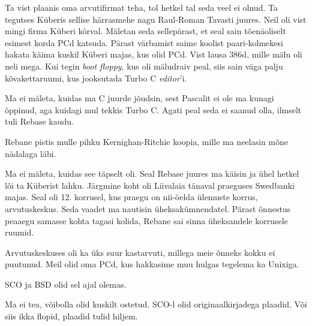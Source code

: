 
Ta vist plaanis oma arvutifirmat teha, tol 
hetkel tal seda veel ei olnud. Ta tegutses Küberis sellise 
härrasmehe nagu Raul-Roman Tavasti juures. Neil 
oli vist mingi firma Küberi kõrval. Mäletan seda sellepärast, et seal sain tõenäoliselt esimest korda PCd katsuda. Pärast värbamist saime koolist paari-kolmekesi hakata käima 
kuskil Küberi majas, kus olid PCd. Vist 
lausa 386d, mille mälu oli neli mega. Kui tegin 
\emph{boot floppy}, kus oli mäludraiv peal, siis sain väga palju 
kõvakettaruumi, kus jooksutada Turbo C \emph{editor}'i.


Ma ei mäleta, kuidas ma C juurde 
jõudsin, sest Pascalit ei ole ma kunagi õppinud, aga kuidagi mul tekkis 
Turbo C. Agati peal seda ei saanud olla, ilmselt tuli Rebase kaudu. 

Rebane pistis mulle pihku Kernighan-Ritchie koopia, mille ma neelasin 
mõne nädalaga läbi.


Ma ei mäleta, kuidas see täpselt oli. Seal Rebase juures ma käisin ja ühel
hetkel lõi ta Küberist lahku. Järgmine koht oli Liivalaia tänaval praeguses
Swedbanki majas. Seal oli 12. korrusel, kus 
praegu on nii-öelda ülemuste korrus, arvutuskeskus. Seda vaadet ma nautisin üheksakümnendatel. Pärast õnnestus peaaegu samasse kohta tagasi kolida, Rebane sai sinna üheksandele 
korrusele ruumid. 

Arvutuskeskuses oli ka üks suur kastarvuti, millega meie õnneks kokku ei puutunud. Meil olid oma 
PCd, kus hakkasime muu hulgas tegelema ka Unixiga.


SCO ja BSD olid sel ajal olemas.


Ma ei tea, võibolla olid kuskilt ostetud. SCO-l olid originaalkirjadega plaadid. Või siis ikka flopid, 
plaadid tulid hiljem. 

